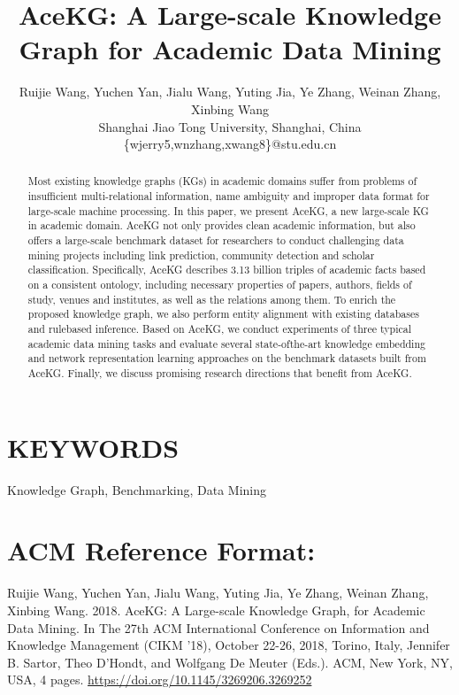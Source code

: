 \documentclass[10pt]{article}
\title{AceKG: A Large-scale Knowledge Graph for Academic Data Mining }
\author{Ruijie Wang, Yuchen Yan, Jialu Wang, Yuting Jia, Ye Zhang, Weinan Zhang, Xinbing Wang\\
Shanghai Jiao Tong University, Shanghai, China\\
\{wjerry5,wnzhang,xwang8\}@stu.edu.cn}
\date{}
\begin{document}
\maketitle


\begin{abstract}
Most existing knowledge graphs (KGs) in academic domains suffer from problems of insufficient multi-relational information, name ambiguity and improper data format for large-scale machine processing. In this paper, we present AceKG, a new large-scale KG in academic domain. AceKG not only provides clean academic information, but also offers a large-scale benchmark dataset for researchers to conduct challenging data mining projects including link prediction, community detection and scholar classification. Specifically, AceKG describes 3.13 billion triples of academic facts based on a consistent ontology, including necessary properties of papers, authors, fields of study, venues and institutes, as well as the relations among them. To enrich the proposed knowledge graph, we also perform entity alignment with existing databases and rulebased inference. Based on AceKG, we conduct experiments of three typical academic data mining tasks and evaluate several state-ofthe-art knowledge embedding and network representation learning approaches on the benchmark datasets built from AceKG. Finally, we discuss promising research directions that benefit from AceKG.
\end{abstract}

\section*{KEYWORDS}
Knowledge Graph, Benchmarking, Data Mining

\section*{ACM Reference Format:}
Ruijie Wang, Yuchen Yan, Jialu Wang, Yuting Jia, Ye Zhang, Weinan Zhang, Xinbing Wang. 2018. AceKG: A Large-scale Knowledge Graph, for Academic Data Mining. In The 27th ACM International Conference on Information and Knowledge Management (CIKM '18), October 22-26, 2018, Torino, Italy, Jennifer B. Sartor, Theo D'Hondt, and Wolfgang De Meuter (Eds.). ACM, New York, NY, USA, 4 pages. \href{https://doi.org/10.1145/3269206.3269252}{https://doi.org/10.1145/3269206.3269252}
\end{document}
